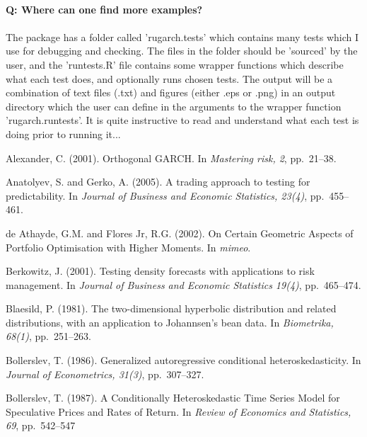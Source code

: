 \\
\textbf{Q: Where can one find more examples?}\\
\\
The package has a folder called 'rugarch.tests' which contains many tests
which I use for debugging and checking. The files in the folder should be
'sourced' by the user, and the 'runtests.R' file contains some wrapper functions
which describe what each test does, and optionally runs chosen tests. The
output will be a combination of text files (.txt) and figures (either .eps or
.png) in an output directory which the user can define in the arguments to the
wrapper function 'rugarch.runtests'. It is quite instructive to read and
understand what each test is doing prior to running it...\\

\begin{thebibliography}{}

Alexander, C. (2001).
\newblock Orthogonal GARCH.
\newblock In \emph{Mastering risk, 2}, pp.~21--38.

Anatolyev, S. and Gerko, A. (2005).
\newblock  A trading approach to testing for predictability.
\newblock In \emph{Journal of Business and Economic Statistics, 23(4)},
pp.~455--461.

de Athayde, G.M. and Flores Jr, R.G. (2002).
\newblock On Certain Geometric Aspects of Portfolio Optimisation with Higher Moments.
\newblock In \emph{mimeo}.

Berkowitz, J. (2001).
\newblock Testing density forecasts with applications to risk management.
\newblock In \emph{Journal of Business and Economic Statistics 19(4)}, pp.~465--474.

Blaesild, P. (1981).
\newblock The two-dimensional hyperbolic distribution and related distributions, with an application to Johannsen's bean data.
\newblock In \emph{Biometrika, 68(1)}, pp.~251--263.

Bollerslev, T. (1986).
\newblock Generalized autoregressive conditional heteroskedasticity.
\newblock In \emph{Journal of Econometrics, 31(3)}, pp.~307--327.

Bollerslev, T. (1987).
\newblock A Conditionally Heteroskedastic Time Series Model for Speculative Prices and Rates of Return.
\newblock In \emph{Review of Economics and Statistics, 69}, pp.~542--547


\end{thebibliography}
